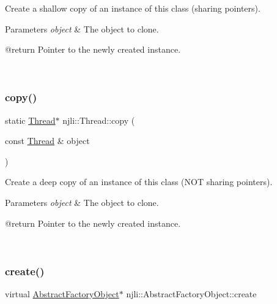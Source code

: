 Create a shallow copy of an instance of this class (sharing pointers).


\begin{DoxyParams}{Parameters}
{\em object} & The object to clone. \begin{DoxyVerb} @return Pointer to the newly created instance.\end{DoxyVerb}
 \\
\hline
\end{DoxyParams}
\mbox{\label{classnjli_1_1_thread_ae4597841975827e25aaeea32f4e465fa}} 
\subsubsection{\texorpdfstring{copy()}{copy()}}
{\footnotesize\ttfamily static \mbox{\hyperlink{classnjli_1_1_thread}{Thread}}$\ast$ njli\+::\+Thread\+::copy (\begin{DoxyParamCaption}\item[{const \mbox{\hyperlink{classnjli_1_1_thread}{Thread}} \&}]{object }\end{DoxyParamCaption})\hspace{0.3cm}{\ttfamily [static]}}

Create a deep copy of an instance of this class (N\+OT sharing pointers).


\begin{DoxyParams}{Parameters}
{\em object} & The object to clone. \begin{DoxyVerb} @return Pointer to the newly created instance.\end{DoxyVerb}
 \\
\hline
\end{DoxyParams}
\mbox{\label{classnjli_1_1_thread_a83a8876ae63b92804004cf3febe76573}} 
\subsubsection{\texorpdfstring{create()}{create()}\hspace{0.1cm}{\footnotesize\ttfamily [1/3]}}
{\footnotesize\ttfamily virtual \mbox{\hyperlink{classnjli_1_1_abstract_factory_object}{Abstract\+Factory\+Object}}$\ast$ njli\+::\+Abstract\+Factory\+Object\+::create}

